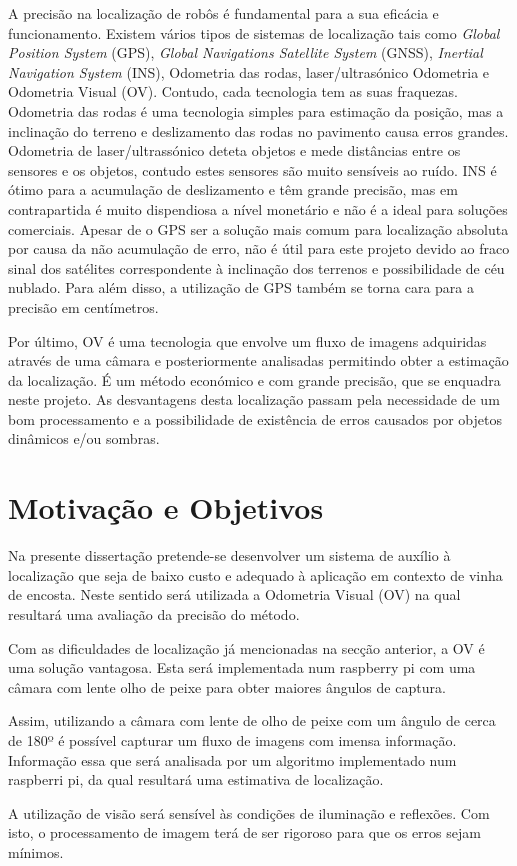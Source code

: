 A precisão na localização de robôs é fundamental para a sua eficácia e funcionamento. Existem vários tipos de sistemas de localização tais como \textit{Global Position System} (GPS), \textit{Global Navigations Satellite System} (GNSS), \textit{Inertial Navigation System} (INS), Odometria das rodas, laser/ultrasónico Odometria e Odometria Visual (OV). Contudo, cada tecnologia tem as suas fraquezas. Odometria das rodas é uma tecnologia simples para estimação da posição, mas a inclinação do terreno e deslizamento das rodas no pavimento causa erros grandes. Odometria de  laser/ultrassónico  deteta objetos e mede distâncias entre os sensores e os objetos, contudo estes sensores são muito sensíveis ao ruído. INS é ótimo para a acumulação de deslizamento e têm grande precisão, mas em contrapartida é muito dispendiosa a nível monetário e não é a ideal para soluções comerciais. Apesar de o GPS  ser a solução mais comum para localização absoluta por causa da não acumulação de erro, não é útil para este projeto devido ao fraco sinal dos satélites correspondente à inclinação dos terrenos e possibilidade de céu nublado. Para além disso, a utilização de GPS também se torna cara para a precisão em centímetros. \cite{Aqel2016}

Por último, OV é uma tecnologia que envolve um fluxo de imagens adquiridas através de uma câmara e posteriormente analisadas permitindo obter a estimação da localização. É um método económico e com grande precisão, que se enquadra neste projeto. As desvantagens desta localização passam pela necessidade de um bom processamento e a possibilidade de existência de erros causados por objetos dinâmicos e/ou sombras.

\section{Motivação e Objetivos} \label{sec:context}

Na presente dissertação pretende-se desenvolver um sistema de auxílio à localização que seja de baixo custo e adequado à aplicação em contexto de vinha de encosta. Neste sentido será utilizada a Odometria Visual (OV) na qual resultará uma avaliação da precisão do método.


Com as dificuldades de localização já mencionadas na secção anterior, a  OV é uma solução vantagosa. Esta será implementada num raspberry pi com uma câmara com lente olho de peixe para obter maiores ângulos de captura.

Assim, utilizando a câmara com lente de olho de peixe com um ângulo de cerca de 180º é possível capturar um fluxo de imagens com imensa informação. Informação essa que será analisada por um algoritmo implementado num raspberri pi, da qual resultará uma estimativa de localização.

A utilização de visão será sensível às condições de iluminação e reflexões. Com isto, o processamento de imagem terá de ser rigoroso para que os erros sejam mínimos.




